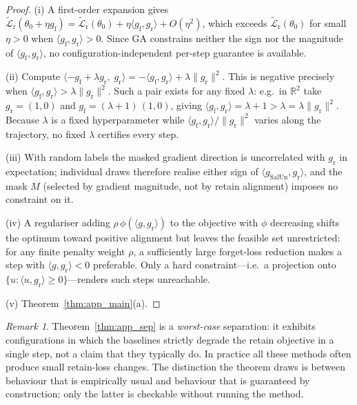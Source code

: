\documentclass{article}
\newcommand{\gf}{g_{\mathrm{f}}}
\newcommand{\gr}{g_{\mathrm{r}}}
\newcommand{\Lrt}{\widetilde{\mathcal{L}}_{\mathrm{r}}}
\theoremstyle{remark}
\newtheorem{remark}{Remark}
\theoremstyle{plain}
\begin{document}
\begin{proof}
(i) A first-order expansion gives
$\Lrt(\theta_0+\eta\gf) = \Lrt(\theta_0) + \eta\langle \gf,\gr\rangle + O(\eta^2)$,
which exceeds $\Lrt(\theta_0)$ for small $\eta>0$ when
$\langle\gf,\gr\rangle>0$. Since GA constrains neither the sign nor the
magnitude of $\langle\gf,\gr\rangle$, no configuration-independent per-step
guarantee is available.

(ii) Compute
$\langle -\gf+\lambda\gr,\;\gr\rangle = -\langle\gf,\gr\rangle+\lambda\|\gr\|^2$.
This is negative precisely when
$\langle\gf,\gr\rangle > \lambda\|\gr\|^2$. Such a pair exists for any fixed
$\lambda$: e.g.\ in $\mathbb{R}^2$ take $\gr=(1,0)$ and
$\gf = (\lambda+1)\,(1,0)$, giving
$\langle\gf,\gr\rangle = \lambda+1 > \lambda = \lambda\|\gr\|^2$. Because
$\lambda$ is a fixed hyperparameter while $\langle\gf,\gr\rangle/\|\gr\|^2$
varies along the trajectory, no fixed $\lambda$ certifies every step.

(iii) With random labels the masked gradient direction is uncorrelated with
$\gr$ in expectation; individual draws therefore realise either sign of
$\langle g_{\mathrm{SalUn}},\gr\rangle$, and the mask $M$ (selected by gradient
magnitude, not by retain alignment) imposes no constraint on it.

(iv) A regulariser adding $\rho\,\phi(\langle g,\gr\rangle)$ to the objective
with $\phi$ decreasing shifts the optimum toward positive alignment but leaves
the feasible set unrestricted: for any finite penalty weight $\rho$, a
sufficiently large forget-loss reduction makes a step with
$\langle g,\gr\rangle<0$ preferable. Only a hard constraint---i.e.\ a projection
onto $\{u:\langle u,\gr\rangle\ge0\}$---renders such steps unreachable.

(v) Theorem~\ref{thm:app_main}(a).
\end{proof}

\begin{remark}
Theorem~\ref{thm:app_sep} is a \emph{worst-case} separation: it exhibits
configurations in which the baselines strictly degrade the retain objective in a
single step, not a claim that they typically do. In practice all these methods
often produce small retain-loss changes. The distinction the theorem draws is
between behaviour that is empirically usual and behaviour that is guaranteed by
construction; only the latter is checkable without running the method.
\end{remark}

\end{document}
